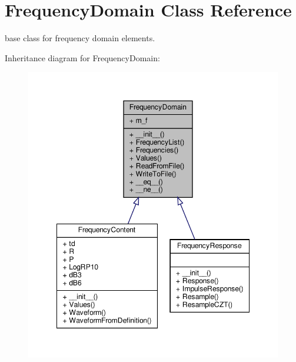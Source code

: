 \hypertarget{classSignalIntegrity_1_1FrequencyDomain_1_1FrequencyDomain_1_1FrequencyDomain}{}\section{Frequency\+Domain Class Reference}
\label{classSignalIntegrity_1_1FrequencyDomain_1_1FrequencyDomain_1_1FrequencyDomain}


base class for frequency domain elements.  




Inheritance diagram for Frequency\+Domain\+:\nopagebreak
\begin{figure}[H]
\begin{center}
\leavevmode
\includegraphics[width=348pt]{classSignalIntegrity_1_1FrequencyDomain_1_1FrequencyDomain_1_1FrequencyDomain__inherit__graph}
\end{center}
\end{figure}


